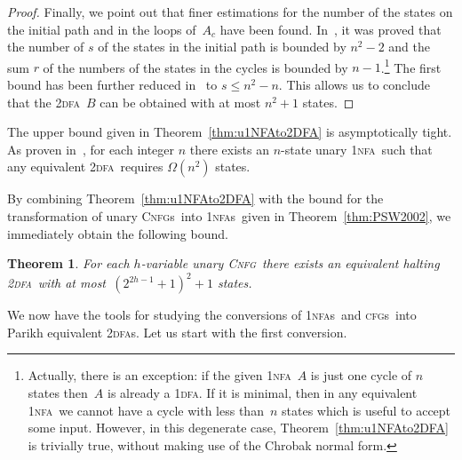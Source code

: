 \documentclass[11pt]{article}
\newcommand*{\tw}{\textsc{2}}
\newcommand*{\twdfa}{\tw\textsc{dfa}}
\newcommand*{\twdfas}{\tw\textsc{dfa}s}
\newcommand*{\ow}{\textsc{1}}
\newcommand*{\owdfa}{\ow\textsc{dfa}}
\newcommand*{\ownfa}{\ow\textsc{nfa}}
\newcommand*{\ownfas}{\ow\textsc{nfa}s}
\newcommand*{\cfgs}{\textsc{cfg}s}
\newcommand*{\cnfg}{\textsc{Cnfg}}
\newcommand*{\cnfgs}{\textsc{Cnfg}s}
\newtheorem{theorem}{Theorem}[section]
\begin{document}
\begin{proof}
	Finally, we point out that finer estimations for the number of the states on the initial path and in the
	loops of~$A_c$ have been found. In~\cite{Geffert2007}, it was proved that the number of $s$ of the states
	in the initial path is bounded by $n^2-2$ and the sum $r$ of the numbers of the states in the cycles 
	is bounded by $n-1$.\footnote{Actually, there is an exception: if the given \ownfa~$A$ is just one cycle of $n$ states then~$A$ is
	already a \owdfa. If it is minimal, then in any equivalent \ownfa\ we cannot have a cycle with less than~$n$ states
	which is useful to accept some input.
	However, in this degenerate case, Theorem~\ref{thm:u1NFAto2DFA} is trivially true, without making use of the Chrobak
	normal form.}
	The first bound has been further reduced in~\cite{Gawrychowski2011}
	to $s\leq n^2-n$. This allows us to conclude that the \twdfa~$B$ can be obtained
	with at most $n^2+1$ states.
\end{proof}

The upper bound given in Theorem~\ref{thm:u1NFAto2DFA} is asymptotically tight. As proven in~\cite[Thm.~6.3]{Chrobak1986},
for each integer $n$ there exists an $n$-state unary \ownfa\ such that any equivalent \twdfa\ requires
$\Omega(n^2)$ states.

\medskip

By combining Theorem~\ref{thm:u1NFAto2DFA} with the bound for the transformation of
unary \cnfgs\ into \ownfas\ given in Theorem~\ref{thm:PSW2002}, we immediately obtain the
following bound.

\begin{theorem}\label{thm:uCFGto2DFA}
  For each  $h$-variable unary \cnfg\ there exists an equivalent halting \twdfa\ with 
  at most~$(2^{2h-1}+1)^2+1$ states.
\end{theorem}

We now have the tools for studying the conversions of \ownfas\ and \cfgs\ into Parikh equivalent \twdfas.
Let us start with the first conversion.
\end{document}
